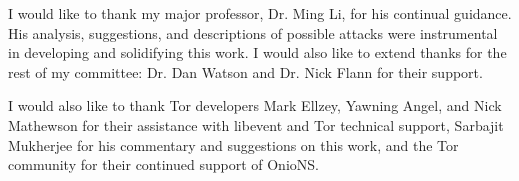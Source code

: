 
\begin{dedication}

I would like to thank my major professor, Dr. Ming Li, for his continual guidance. His analysis, suggestions, and descriptions of possible attacks were instrumental in developing and solidifying this work. I would also like to extend thanks for the rest of my committee: Dr. Dan Watson and Dr. Nick Flann for their support. 

I would also like to thank Tor developers Mark Ellzey, Yawning Angel, and Nick Mathewson for their assistance with libevent and Tor technical support, Sarbajit Mukherjee for his commentary and suggestions on this work, and the Tor community for their continued support of OnioNS.

\end{dedication}